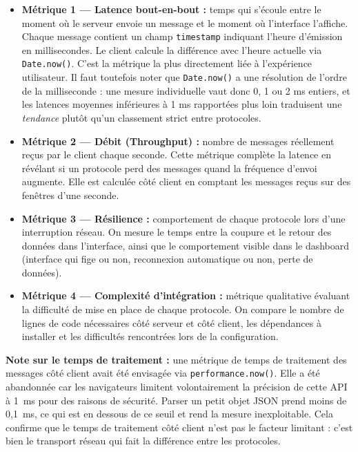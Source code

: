 \begin{itemize}
    \item \textbf{Métrique 1 --- Latence bout-en-bout :} temps qui s'écoule entre le moment où le serveur envoie un message et le moment où l'interface l'affiche. Chaque message contient un champ \texttt{timestamp} indiquant l'heure d'émission en millisecondes. Le client calcule la différence avec l'heure actuelle via \texttt{Date.now()}. C'est la métrique la plus directement liée à l'expérience utilisateur. Il faut toutefois noter que \texttt{Date.now()} a une résolution de l'ordre de la milliseconde : une mesure individuelle vaut donc 0, 1 ou 2 ms entiers, et les latences moyennes inférieures à 1 ms rapportées plus loin traduisent une \textit{tendance} plutôt qu'un classement strict entre protocoles.

    \item \textbf{Métrique 2 --- Débit (Throughput) :} nombre de messages réellement reçus par le client chaque seconde. Cette métrique complète la latence en révélant si un protocole perd des messages quand la fréquence d'envoi augmente. Elle est calculée côté client en comptant les messages reçus sur des fenêtres d'une seconde.

    \item \textbf{Métrique 3 --- Résilience :} comportement de chaque protocole lors d'une interruption réseau. On mesure le temps entre la coupure et le retour des données dans l'interface, ainsi que le comportement visible dans le dashboard (interface qui fige ou non, reconnexion automatique ou non, perte de données).

    \item \textbf{Métrique 4 --- Complexité d'intégration :} métrique qualitative évaluant la difficulté de mise en place de chaque protocole. On compare le nombre de lignes de code nécessaires côté serveur et côté client, les dépendances à installer et les difficultés rencontrées lors de la configuration.
\end{itemize}

\textbf{Note sur le temps de traitement :} une métrique de temps de traitement des messages côté client avait été envisagée via \texttt{performance.now()}. Elle a été abandonnée car les navigateurs limitent volontairement la précision de cette API à 1~ms pour des raisons de sécurité. Parser un petit objet JSON prend moins de 0,1~ms, ce qui est en dessous de ce seuil et rend la mesure inexploitable. Cela confirme que le temps de traitement côté client n'est pas le facteur limitant : c'est bien le transport réseau qui fait la différence entre les protocoles.

